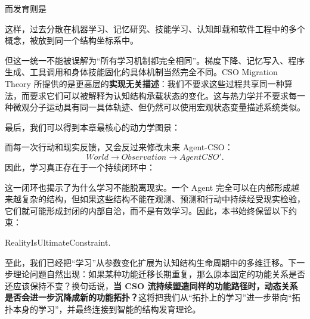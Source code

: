 而发育则是
\begin{statementbox}
\centering
{}
\end{statementbox}

这样，过去分散在机器学习、记忆研究、技能学习、认知卸载和软件工程中的多个概念，被放到同一个结构坐标系中。

但这一统一不能被误解为“所有学习机制都完全相同”。梯度下降、记忆写入、程序生成、工具调用和身体技能固化的具体机制当然完全不同。CSO Migration Theory 所提供的是更高层的\textbf{实现无关描述}：我们不要求这些过程共享同一种算法，而要求它们可以被解释为认知结构承载状态的变化。这与热力学并不要求每一种微观分子运动具有同一具体轨迹、但仍然可以使用宏观状态变量描述系统类似。

最后，我们可以得到本章最核心的动力学图景：
\begin{statementbox}
\centering
{}
\end{statementbox}
而每一次行动和现实反馈，又会反过来修改未来 Agent-CSO：
\[
World
\rightarrow
Observation
\rightarrow
AgentCSO'
.
\]
因此，学习真正存在于一个持续闭环中：
\begin{statementbox}
\centering
{}
\end{statementbox}

这一闭环也揭示了为什么学习不能脱离现实。一个 Agent 完全可以在内部形成越来越复杂的结构，但如果这些结构不能在观测、预测和行动中持续经受现实检验，它们就可能形成封闭的内部自洽，而不是有效学习。因此，本书始终保留以下约束：
\begin{statementbox}
RealityIsUltimateConstraint.
\end{statementbox}

至此，我们已经把“学习”从参数变化扩展为认知结构生命周期中的多维迁移。下一步理论问题自然出现：如果某种功能迁移长期重复，那么原本固定的功能关系是否还应该保持不变？换句话说，\textbf{当 CSO 流持续塑造同样的功能路径时，动态关系是否会进一步沉降成新的功能拓扑？}这将把我们从“拓扑上的学习”进一步带向“拓扑本身的学习”，并最终连接到智能的结构发育理论。
